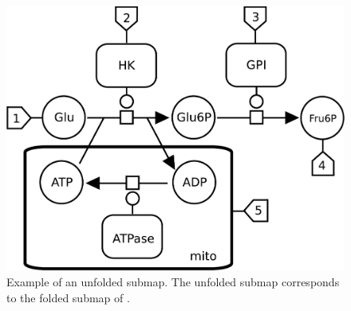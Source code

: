 \begin{figure}[H]
  \centering
  \includegraphics[scale = 0.35]{examples/submap-dissociated}
  \caption{Example of an unfolded submap. The unfolded submap corresponds to the folded submap of .}
  \label{fig:submap-unfolded}
\end{figure}







